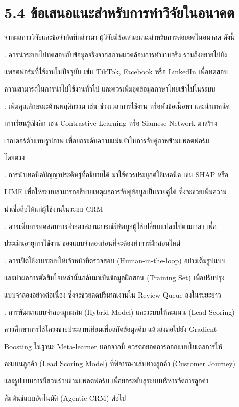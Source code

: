 \documentclass[12pt,a4paper]{report}
\begin{document}
\section*{5.4 ข้อเสนอแนะสำหรับการทำวิจัยในอนาคต}
จากผลการวิจัยและข้อจำกัดที่กล่าวมา ผู้วิจัยมีข้อเสนอแนะสำหรับการต่อยอดในอนาคต ดังนี้\par
{}. ควรนำระบบไปทดสอบกับข้อมูลจริงจากสภาพแวดล้อมการทำงานจริง รวมถึงขยายไปยัง\par
แพลตฟอร์มที่ใช้งานในปัจจุบัน เช่น TikTok, Facebook หรือ LinkedIn เพื่อทดสอบ\par
ความสามารถในการนำไปใช้งานทั่วไป และควรเพิ่มชุดข้อมูลภาษาไทยเข้าไปในระบบ\par
{}. เพิ่มคุณลักษณะด้านพฤติกรรม เช่น ช่วงเวลาการใช้งาน หรือหัวข้อเนื้อหา และนำเทคนิค\par
การเรียนรู้เชิงลึก เช่น Contrastive Learning หรือ Siamese Network มาสร้าง\par
เวกเตอร์ตัวแทนรูปภาพ เพื่อยกระดับความแม่นยำในการจับคู่ภาพข้ามแพลตฟอร์ม\par
โดยตรง\par
{}. การนำเทคนิคปัญญาประดิษฐ์ที่อธิบายได้ มาใช้ควรประยุกต์ใช้เทคนิค เช่น SHAP หรือ\par
LIME เพื่อให้ระบบสามารถอธิบายเหตุผลการจับคู่ข้อมูลเป็นรายคู่ได้ ซึ่งจะช่วยเพิ่มความ\par
น่าเชื่อถือให้แก่ผู้ใช้งานในระบบ CRM\par
{}. ควรเพิ่มการทดสอบการจำลองสถานการณ์ที่ข้อมูลผู้ใช้เปลี่ยนแปลงไปตามเวลา เพื่อ\par
ประเมินอายุการใช้งาน ของแบบจำลองก่อนที่จะต้องทำการฝึกสอนใหม่\par
{}. ควรเปิดใช้งานระบบให้เจ้าหน้าที่ตรวจสอบ (Human-in-the-loop) อย่างเต็มรูปแบบ\par
และนำผลการตัดสินใจเหล่านั้นกลับมาเป็นข้อมูลฝึกสอน (Training Set) เพื่อปรับปรุง\par
แบบจำลองอย่างต่อเนื่อง ซึ่งจะช่วยลดปริมาณงานใน Review Queue ลงในระยะยาว\par
{}. การพัฒนาแบบจำลองลูกผสม (Hybrid Model) และระบบให้คะแนน (Lead Scoring)\par
ควรศึกษาการใช้โครงข่ายประสาทเทียมเพื่อสกัดข้อมูลดิบ แล้วส่งต่อไปยัง Gradient\par
Boosting ในฐานะ Meta-learner นอกจากนี้ ควรต่อยอดการออกแบบโมเดลการให้\par
คะแนนลูกค้า (Lead Scoring Model) ที่พิจารณาเส้นทางลูกค้า (Customer Journey)\par
\clearpage
และรูปแบบการมีส่วนร่วมข้ามแพลตฟอร์ม เพื่อยกระดับสู่ระบบบริหารจัดการลูกค้า\par
สัมพันธ์แบบอัตโนมัติ (Agentic CRM) ต่อไป\par
\clearpage
\end{document}
